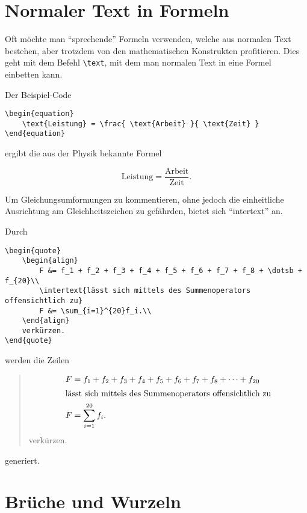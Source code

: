 \section{Normaler Text in Formeln}

Oft möchte man \enquote{sprechende} Formeln verwenden, welche aus normalen Text bestehen, aber trotzdem von den mathematischen Konstrukten profitieren. Dies geht mit dem Befehl \texttt{\textbackslash text}, mit dem man normalen Text in eine Formel einbetten kann.

Der Beispiel-Code
\begin{lstlisting}
\begin{equation}
	\text{Leistung} = \frac{ \text{Arbeit} }{ \text{Zeit} }
\end{equation}
\end{lstlisting} 

ergibt die aus der Physik bekannte Formel

\begin{equation}
	\text{Leistung} = \frac{ \text{Arbeit} }{ \text{Zeit} }.
\end{equation}

Um Gleichungsumformungen zu kommentieren, ohne jedoch die einheitliche Ausrichtung am Gleichheitszeichen zu gefährden, bietet sich \enquote{intertext} an.

Durch
\begin{lstlisting}
\begin{quote}
	\begin{align}
		F &= f_1 + f_2 + f_3 + f_4 + f_5 + f_6 + f_7 + f_8 + \dotsb + f_{20}\\
		\intertext{lässt sich mittels des Summenoperators offensichtlich zu}
		F &= \sum_{i=1}^{20}f_i.\\
	\end{align}
	verkürzen.
\end{quote}
\end{lstlisting}

werden die Zeilen
\begin{quote}
	\begin{align}
		F &= f_1 + f_2 + f_3 + f_4 + f_5 + f_6 + f_7 + f_8 + \dotsb + f_{20}\\
		\intertext{lässt sich mittels des Summenoperators offensichtlich zu}
		F &= \sum_{i=1}^{20}f_i.
	\end{align}
	verkürzen.
\end{quote}
generiert.

\section{Brüche und Wurzeln}

